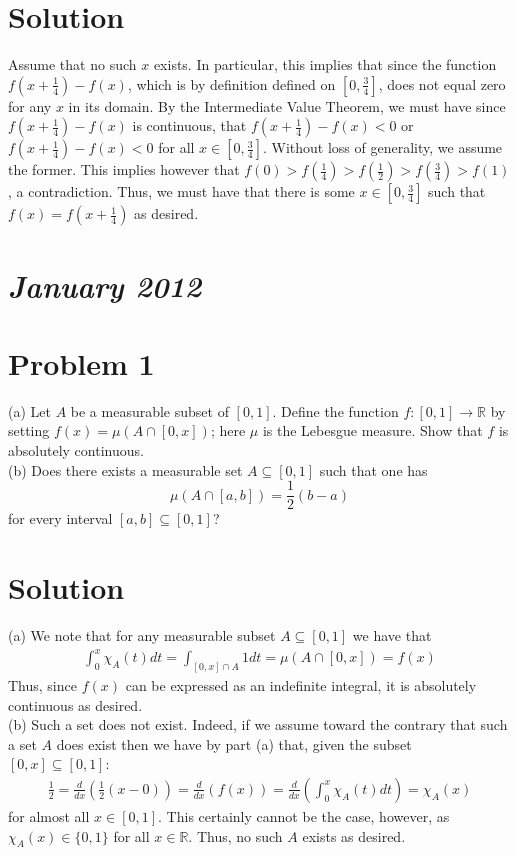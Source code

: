 \documentclass{article}
\begin{document}
\section*{Solution}
Assume that no such $x$ exists.  In particular, this implies that since the function $f(x+\frac{1}{4})-f(x)$, which is by definition defined on $[0,\frac{3}{4}]$, does not equal zero for any $x$ in its domain.  By the Intermediate Value Theorem, we must have since $f(x+\frac{1}{4})-f(x)$ is continuous, that $f(x+\frac{1}{4})-f(x)<0$ or $f(x+\frac{1}{4})-f(x)<0$ for all $x\in[0,\frac{3}{4}]$.  Without loss of generality, we assume the former.  This implies however that $f(0)>f(\frac{1}{4})>f(\frac{1}{2})>f(\frac{3}{4})>f(1)$, a contradiction.  Thus, we must have that there is some $x\in[0,\frac{3}{4}]$ such that $f(x)=f(x+\frac{1}{4})$ as desired.

\section*{{\it January 2012}}

\section*{Problem 1}
(a) Let $A$ be a measurable subset of $[0,1]$.  Define the function $f:[0,1]\rightarrow\mathbb{R}$ by setting $f(x)=\mu(A\cap[0,x])$; here $\mu$ is the Lebesgue measure.  Show that $f$ is absolutely continuous.\\

\noindent (b) Does there exists a measurable set $A\subseteq[0,1]$ such that one has $$\mu(A\cap[a,b])=\frac{1}{2}(b-a)$$ for every interval $[a,b]\subseteq[0,1]$?\\


\section*{Solution}
(a) We note that for any measurable subset $A\subseteq[0,1]$ we have that
\begin{align*}
\int_0^x\chi_A(t)dt=\int_{[0,x]\cap A}1dt=\mu(A\cap[0,x])=f(x)
\end{align*}
Thus, since $f(x)$ can be expressed as an indefinite integral, it is absolutely continuous as desired.\\

\noindent (b) Such a set does not exist.  Indeed, if we assume toward the contrary that such a set $A$ does exist then we have by part (a) that, given the subset $[0,x]\subseteq[0,1]$:
\begin{align*}
\frac{1}{2}=\frac{d}{dx}\left(\frac{1}{2}(x-0)\right)=\frac{d}{dx}(f(x))=\frac{d}{dx}\left(\int_0^x\chi_A(t)dt\right)=\chi_A(x)
\end{align*}
for almost all $x\in[0,1]$.  This certainly cannot be the case, however, as $\chi_A(x)\in\{0,1\}$ for all $x\in\mathbb{R}$.  Thus, no such $A$ exists as desired.
\end{document}
